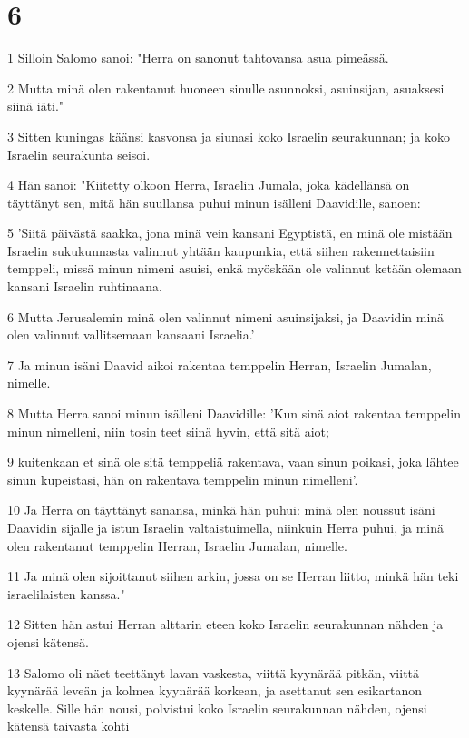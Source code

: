 \chapter{6}

\par 1 Silloin Salomo sanoi: "Herra on sanonut tahtovansa asua pimeässä.
\par 2 Mutta minä olen rakentanut huoneen sinulle asunnoksi, asuinsijan, asuaksesi siinä iäti."
\par 3 Sitten kuningas käänsi kasvonsa ja siunasi koko Israelin seurakunnan; ja koko Israelin seurakunta seisoi.
\par 4 Hän sanoi: "Kiitetty olkoon Herra, Israelin Jumala, joka kädellänsä on täyttänyt sen, mitä hän suullansa puhui minun isälleni Daavidille, sanoen:
\par 5 'Siitä päivästä saakka, jona minä vein kansani Egyptistä, en minä ole mistään Israelin sukukunnasta valinnut yhtään kaupunkia, että siihen rakennettaisiin temppeli, missä minun nimeni asuisi, enkä myöskään ole valinnut ketään olemaan kansani Israelin ruhtinaana.
\par 6 Mutta Jerusalemin minä olen valinnut nimeni asuinsijaksi, ja Daavidin minä olen valinnut vallitsemaan kansaani Israelia.'
\par 7 Ja minun isäni Daavid aikoi rakentaa temppelin Herran, Israelin Jumalan, nimelle.
\par 8 Mutta Herra sanoi minun isälleni Daavidille: 'Kun sinä aiot rakentaa temppelin minun nimelleni, niin tosin teet siinä hyvin, että sitä aiot;
\par 9 kuitenkaan et sinä ole sitä temppeliä rakentava, vaan sinun poikasi, joka lähtee sinun kupeistasi, hän on rakentava temppelin minun nimelleni'.
\par 10 Ja Herra on täyttänyt sanansa, minkä hän puhui: minä olen noussut isäni Daavidin sijalle ja istun Israelin valtaistuimella, niinkuin Herra puhui, ja minä olen rakentanut temppelin Herran, Israelin Jumalan, nimelle.
\par 11 Ja minä olen sijoittanut siihen arkin, jossa on se Herran liitto, minkä hän teki israelilaisten kanssa."
\par 12 Sitten hän astui Herran alttarin eteen koko Israelin seurakunnan nähden ja ojensi kätensä.
\par 13 Salomo oli näet teettänyt lavan vaskesta, viittä kyynärää pitkän, viittä kyynärää leveän ja kolmea kyynärää korkean, ja asettanut sen esikartanon keskelle. Sille hän nousi, polvistui koko Israelin seurakunnan nähden, ojensi kätensä taivasta kohti
